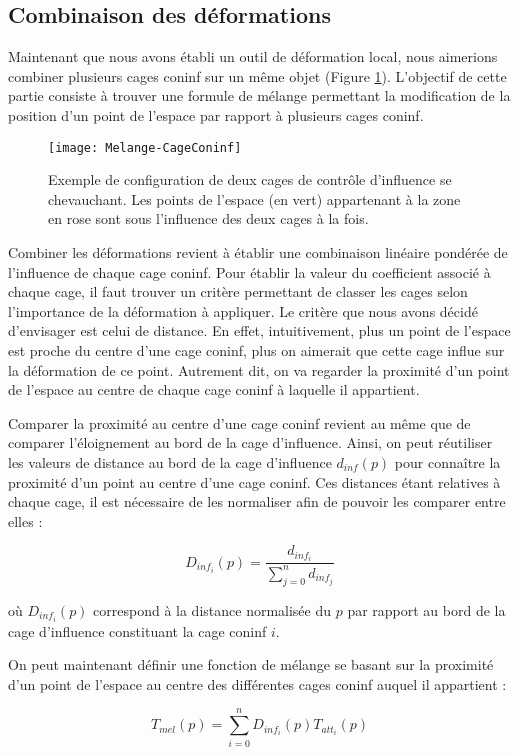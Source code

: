 \subsection{Combinaison des déformations}

Maintenant que nous avons établi un outil de déformation local, nous aimerions
combiner plusieurs cages coninf sur un même objet (Figure \ref{MELMC}).
L'objectif de cette partie consiste à trouver une formule de mélange
permettant la modification de la position d'un point de l'espace par rapport à
plusieurs cages coninf.

\begin{figure}[ht]
  \begin{center}
    \texttt{[image: Melange-CageConinf]}

    \caption{Exemple de configuration de deux cages de contrôle d'influence se
chevauchant. Les points de l'espace (en vert) appartenant à la zone en rose
sont sous l'influence des deux cages à la fois.}

    \label{MELMC}
  \end{center}
\end{figure}

Combiner les déformations revient à établir une combinaison linéaire pondérée
de l'influence de chaque cage coninf. Pour établir la valeur du coefficient
associé à chaque cage, il faut trouver un critère permettant de classer les
cages selon l'importance de la déformation à appliquer. Le critère que nous
avons décidé d'envisager est celui de distance. En effet, intuitivement, plus
un point de l'espace est proche du centre d'une cage coninf, plus on aimerait
que cette cage influe sur la déformation de ce point. Autrement dit, on va
regarder la proximité d'un point de l'espace au centre de chaque cage coninf
à laquelle il appartient.

Comparer la proximité au centre d'une cage coninf revient au même que de
comparer l'éloignement au bord de la cage d'influence. Ainsi, on peut
réutiliser les valeurs de distance au bord de la cage d'influence $d_{inf}(p)$
pour connaître la proximité d'un point au centre d'une cage coninf. Ces
distances étant relatives à chaque cage, il est nécessaire de les normaliser
afin de pouvoir les comparer entre elles :

\begin{equation}
  D_{inf_i}(p) = \frac{d_{inf_i}}{\sum_{j=0}^n d_{inf_j}}
\end{equation}

où $D_{inf_i}(p)$ correspond à la distance normalisée du $p$ par rapport au
bord de la cage d'influence constituant la cage coninf $i$.

On peut maintenant définir une fonction de mélange se basant sur la proximité
d'un point de l'espace au centre des différentes cages coninf auquel il
appartient :

\begin{equation}
  T_{mel}(p) = \sum_{i=0}^n D_{inf_i}(p) T_{att_i}(p)
\end{equation}

